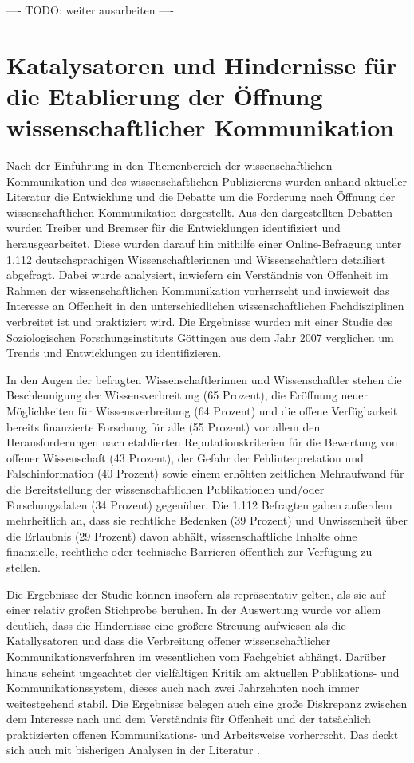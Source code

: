 ---- TODO: weiter ausarbeiten ----

\section{Katalysatoren und Hindernisse für die Etablierung der Öffnung wissenschaftlicher Kommunikation}

Nach der Einführung in den Themenbereich der wissenschaftlichen Kommunikation und des wissenschaftlichen Publizierens wurden anhand aktueller Literatur die Entwicklung und die Debatte um die Forderung nach Öffnung der wissenschaftlichen Kommunikation dargestellt. Aus den dargestellten Debatten wurden Treiber und Bremser für die Entwicklungen identifiziert und herausgearbeitet. Diese wurden darauf hin mithilfe einer Online-Befragung unter 1.112 deutschsprachigen Wissenschaftlerinnen und Wissenschaftlern detailiert abgefragt. Dabei wurde analysiert, inwiefern ein Verständnis von Offenheit im Rahmen der wissenschaftlichen Kommunikation vorherrscht und inwieweit das Interesse an Offenheit in den unterschiedlichen wissenschaftlichen Fachdisziplinen verbreitet ist und praktiziert wird. Die Ergebnisse wurden mit einer Studie des Soziologischen Forschungsinstituts Göttingen aus dem Jahr 2007 verglichen um Trends und Entwicklungen zu identifizieren.

In den Augen der befragten Wissenschaftlerinnen und Wissenschaftler stehen die Beschleunigung der Wissensverbreitung (65 Prozent), die Eröffnung neuer Möglichkeiten für Wissensverbreitung (64 Prozent) und die offene Verfügbarkeit bereits finanzierte Forschung für alle (55 Prozent) vor allem den Herausforderungen nach etablierten Reputationskriterien für die Bewertung von offener Wissenschaft (43 Prozent), der Gefahr der Fehlinterpretation und Falschinformation (40 Prozent) sowie einem erhöhten zeitlichen Mehraufwand für die Bereitstellung der wissenschaftlichen Publikationen und/oder Forschungsdaten (34 Prozent) gegenüber. Die 1.112 Befragten gaben außerdem mehrheitlich an, dass sie rechtliche Bedenken (39 Prozent) und Unwissenheit über die Erlaubnis (29 Prozent) davon abhält, wissenschaftliche Inhalte ohne finanzielle, rechtliche oder technische Barrieren öffentlich zur Verfügung zu stellen.

Die Ergebnisse der Studie können insofern als repräsentativ gelten, als sie auf einer relativ großen Stichprobe beruhen. In der Auswertung wurde vor allem deutlich, dass die Hindernisse eine größere Streuung aufwiesen als die Katallysatoren und dass die Verbreitung offener wissenschaftlicher Kommunikationsverfahren im wesentlichen vom Fachgebiet abhängt. Darüber hinaus scheint ungeachtet der vielfältigen Kritik am aktuellen Publikations- und Kommunikationssystem, dieses auch nach zwei Jahrzehnten noch immer weitestgehend stabil. Die Ergebnisse belegen auch eine große Diskrepanz zwischen dem Interesse nach und dem Verständnis für Offenheit und der tatsächlich praktizierten offenen Kommunikations- und Arbeitsweise vorherrscht. Das deckt sich auch mit bisherigen Analysen in der Literatur \cite{yiotis_2013_open} \cite{Bartling_2013} \cite{hagner_2015_sache_buches} \cite{Fecher_2015}.

